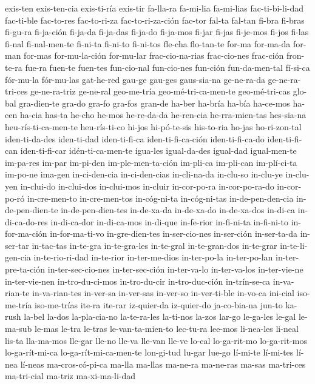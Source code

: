 {exis-ten exis-ten-cia exis-ti-ría exis-tir fa-lla-ra fa-mi-lia fa-mi-lias fac-ti-bi-li-dad fac-ti-ble
fac-to-res fac-to-ri-za fac-to-ri-za-ción fac-tor fal-ta fal-tan fi-bra fi-bras fi-gu-ra fi-ja-ción fi-ja-da
fi-ja-das fi-ja-do fi-ja-mos fi-jar fi-jas fi-je-mos fi-jos fi-las fi-nal fi-nal-men-te fi-ni-ta fi-ni-to
fi-ni-tos fle-cha flo-tan-te for-ma for-ma-da for-man for-mas for-mu-la-ción for-mu-lar frac-cio-na-rias
frac-cio-nes frac-ción fron-te-ra fue-ra fuen-te fuen-tes fun-cio-nal fun-cio-nes fun-ción fun-da-men-tal
fí-si-ca fór-mu-la fór-mu-las gat-he-red gau-ge gau-ges gaus-sia-na ge-ne-ra-da ge-ne-ra-tri-ces
ge-ne-ra-triz ge-ne-ral geo-me-tría geo-mé-tri-ca-men-te geo-mé-tri-cas glo-bal gra-dien-te gra-do gra-fo
gra-fos gran-de ha-ber ha-bría ha-bía ha-ce-mos ha-cen ha-cia has-ta he-cho he-mos he-re-da-da he-ren-cia
he-rra-mien-tas hes-sia-na heu-rís-ti-ca-men-te heu-rís-ti-co hi-jos hi-pó-te-sis his-to-ria ho-jas
ho-ri-zon-tal iden-ti-da-des iden-ti-dad iden-ti-fi-ca iden-ti-fi-ca-ción iden-ti-fi-ca-do iden-ti-fi-can
iden-ti-fi-car idén-ti-ca-men-te igua-les igual-da-des igual-dad igual-men-te im-pa-res im-par im-pi-den
im-ple-men-ta-ción im-pli-ca im-pli-can im-plí-ci-ta im-po-ne ima-gen in-ci-den-cia in-ci-den-cias
in-cli-na-da in-clu-so in-clu-ye in-clu-yen in-clui-do in-clui-dos in-clui-mos in-cluir in-cor-po-ra
in-cor-po-ra-do in-cor-po-ró in-cre-men-to in-cre-men-tos in-cóg-ni-ta in-cóg-ni-tas in-de-pen-den-cia
in-de-pen-dien-te in-de-pen-dien-tes in-de-xa-da in-de-xa-do in-de-xa-dos in-di-ca in-di-ca-do-res
in-di-ca-dor in-di-ca-mos in-di-que in-fe-rior in-fi-ni-ta in-fi-ni-to in-for-ma-ción in-for-ma-ti-vo
in-gre-dien-tes in-ser-cio-nes in-ser-ción in-ser-ta-da in-ser-tar in-tac-tas in-te-gra in-te-gra-les
in-te-gral in-te-gran-dos in-te-grar in-te-li-gen-cia in-te-rio-ri-dad in-te-rior in-ter-me-dios
in-ter-po-la in-ter-po-lan in-ter-pre-ta-ción in-ter-sec-cio-nes in-ter-sec-ción in-ter-va-lo in-ter-va-los
in-ter-vie-ne in-ter-vie-nen in-tro-du-ci-mos in-tro-du-cir in-tro-duc-ción in-trín-se-ca in-va-rian-te
in-va-rian-tes in-ver-sa in-ver-sas in-ver-so in-ver-ti-ble in-vo-ca ini-cial iso-me-tría iso-me-trías
ite-ra ite-rar iz-quier-da iz-quier-do ja-co-bia-na jun-to ka-rush la-bel la-dos la-pla-cia-no la-te-ra-les
la-ti-nos la-zos lar-go le-ga-les le-gal le-ma-sub le-mas le-tra le-tras le-van-ta-mien-to lec-tu-ra lee-mos
li-nea-les li-neal lis-ta lla-ma-mos lle-gar lle-no lle-va lle-van lle-ve lo-cal lo-ga-rit-mo lo-ga-rit-mos
lo-ga-rít-mi-ca lo-ga-rít-mi-ca-men-te lon-gi-tud lu-gar lue-go lí-mi-te lí-mi-tes lí-nea lí-neas
ma-cros-có-pi-ca ma-lla ma-llas ma-ne-ra ma-ne-ras ma-sas ma-tri-ces ma-tri-cial ma-triz ma-xi-ma-li-dad
}
